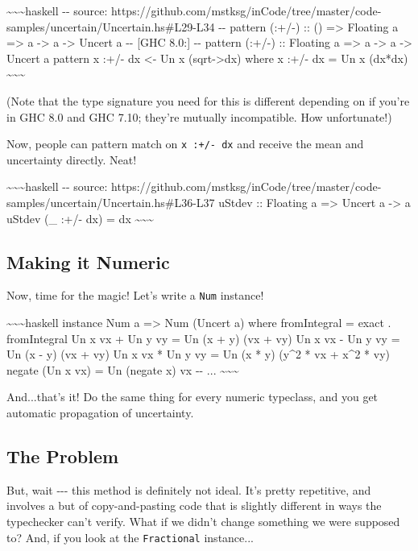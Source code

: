 \documentclass[]{article}
\begin{document}
\textasciitilde{}\textasciitilde{}\textasciitilde{}haskell -\/- source:
https://github.com/mstksg/inCode/tree/master/code-samples/uncertain/Uncertain.hs\#L29-L34
-\/- pattern (:+/-) :: () =\textgreater{} Floating a =\textgreater{} a
-\textgreater{} a -\textgreater{} Uncert a -\/- {[}GHC 8.0:{]} -\/- pattern
(:+/-) :: Floating a =\textgreater{} a -\textgreater{} a -\textgreater{} Uncert
a pattern x :+/- dx \textless{}- Un x (sqrt-\textgreater{}dx) where x :+/- dx =
Un x (dx*dx) \textasciitilde{}\textasciitilde{}\textasciitilde{}

(Note that the type signature you need for this is different depending on if
you're in GHC 8.0 and GHC 7.10; they're mutually incompatible. How unfortunate!)

Now, people can pattern match on \texttt{x\ :+/-\ dx} and receive the mean and
uncertainty directly. Neat!

\textasciitilde{}\textasciitilde{}\textasciitilde{}haskell -\/- source:
https://github.com/mstksg/inCode/tree/master/code-samples/uncertain/Uncertain.hs\#L36-L37
uStdev :: Floating a =\textgreater{} Uncert a -\textgreater{} a uStdev (\_ :+/-
dx) = dx \textasciitilde{}\textasciitilde{}\textasciitilde{}

\subsection{Making it Numeric}

Now, time for the magic! Let's write a \texttt{Num} instance!

\textasciitilde{}\textasciitilde{}\textasciitilde{}haskell instance Num a
=\textgreater{} Num (Uncert a) where fromIntegral = exact . fromIntegral Un x vx
+ Un y vy = Un (x + y) (vx + vy) Un x vx - Un y vy = Un (x - y) (vx + vy) Un x
vx * Un y vy = Un (x * y) (y\^{}2 * vx + x\^{}2 * vy) negate (Un x vx) = Un
(negate x) vx -\/- ... \textasciitilde{}\textasciitilde{}\textasciitilde{}

And...that's it! Do the same thing for every numeric typeclass, and you get
automatic propagation of uncertainty.

\subsection{The Problem}

But, wait -\/-\/- this method is definitely not ideal. It's pretty repetitive,
and involves a but of copy-and-pasting code that is slightly different in ways
the typechecker can't verify. What if we didn't change something we were
supposed to? And, if you look at the \texttt{Fractional} instance...
\end{document}
